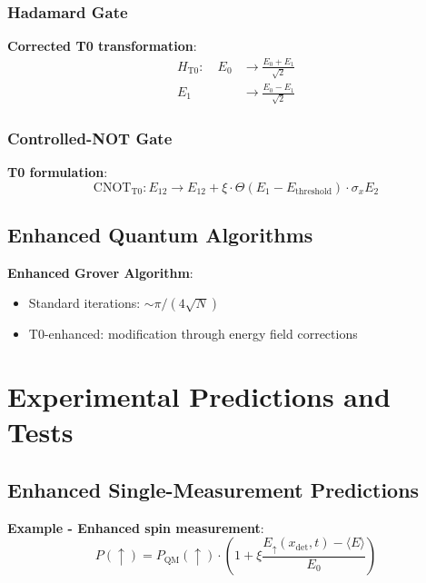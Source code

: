 \documentclass[12pt,a4paper]{article}
\newcommand{\xipar}{\xi}
\begin{document}
	\subsubsection{Hadamard Gate}
	
	\textbf{Corrected T0 transformation}:
	\begin{align}
		H_{\mathrm{T0}}: \quad E_0 &\rightarrow \frac{E_0 + E_1}{\sqrt{2}} \\
		E_1 &\rightarrow \frac{E_0 - E_1}{\sqrt{2}}
	\end{align}
	
	\subsubsection{Controlled-NOT Gate}
	
	\textbf{T0 formulation}:
	\begin{equation}
		\text{CNOT}_{\mathrm{T0}}: E_{12} \rightarrow E_{12} + \xipar \cdot \Theta(E_1 - E_{\mathrm{threshold}}) \cdot \sigma_x E_2
	\end{equation}
	
	\subsection{Enhanced Quantum Algorithms}
	
	\textbf{Enhanced Grover Algorithm}:
	\begin{itemize}
		\item Standard iterations: $\sim \pi/(4\sqrt{N})$
		\item T0-enhanced: modification through energy field corrections
	\end{itemize}
	
	\section{Experimental Predictions and Tests}
	
	\subsection{Enhanced Single-Measurement Predictions}
	
	\textbf{Example - Enhanced spin measurement}:
	\begin{equation}
		\boxed{P(\uparrow) = P_{\mathrm{QM}}(\uparrow) \cdot \left(1 + \xipar \frac{E_{\uparrow}(x_{\mathrm{det}}, t) - \langle E \rangle}{E_0}\right)}
		\label{eq:enhanced_measurement}
	\end{equation}
	
\end{document}
